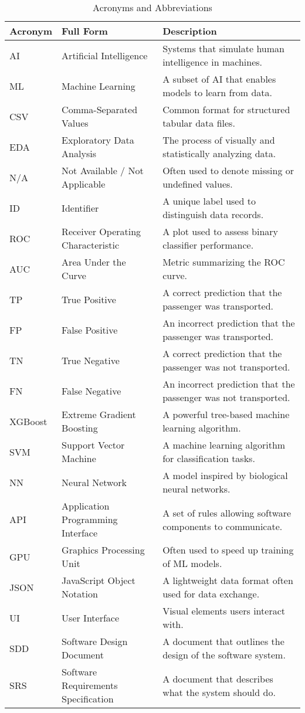 \documentclass[15pt]{article}
\begin{document}
\begin{table}[h!]
    \centering
    \begin{tabular}{|l|l|p{8cm}|}
    \hline
    \textbf{Acronym} & \textbf{Full Form} & \textbf{Description} \\
    \hline
    AI & Artificial Intelligence & Systems that simulate human intelligence in machines. \\
    ML & Machine Learning & A subset of AI that enables models to learn from data. \\
    CSV & Comma-Separated Values & Common format for structured tabular data files. \\
    EDA & Exploratory Data Analysis & The process of visually and statistically analyzing data. \\
    N/A & Not Available / Not Applicable & Often used to denote missing or undefined values. \\
    ID & Identifier & A unique label used to distinguish data records. \\
    ROC & Receiver Operating Characteristic & A plot used to assess binary classifier performance. \\
    AUC & Area Under the Curve & Metric summarizing the ROC curve. \\
    TP & True Positive & A correct prediction that the passenger was transported. \\
    FP & False Positive & An incorrect prediction that the passenger was transported. \\
    TN & True Negative & A correct prediction that the passenger was not transported. \\
    FN & False Negative & An incorrect prediction that the passenger was not transported. \\
    XGBoost & Extreme Gradient Boosting & A powerful tree-based machine learning algorithm. \\
    SVM & Support Vector Machine & A machine learning algorithm for classification tasks. \\
    NN & Neural Network & A model inspired by biological neural networks. \\
    API & Application Programming Interface & A set of rules allowing software components to communicate. \\
    GPU & Graphics Processing Unit & Often used to speed up training of ML models. \\
    JSON & JavaScript Object Notation & A lightweight data format often used for data exchange. \\
    UI & User Interface & Visual elements users interact with. \\
    SDD & Software Design Document & A document that outlines the design of the software system. \\
    SRS & Software Requirements Specification & A document that describes what the system should do. \\
    \hline
    \end{tabular}
    \caption{Acronyms and Abbreviations}
    \end{table}
\end{document}
